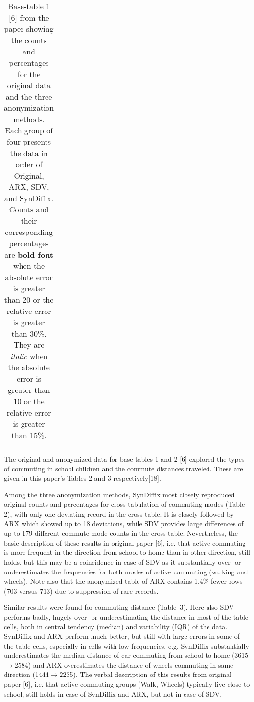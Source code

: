\documentclass[10pt]{article}
\newcommand{\mycite}[1]{[#1]}
\begin{document}
\begin{table}
\begin{center}
\begin{small}
\begin{tabular}{lllllll}
      \bottomrule
      \end{tabular}
      \end{small}
      \caption{Base-table 1 \mycite{6} from the paper showing the counts and percentages for the original data and the three anonymization methods. Each group of four presents the data in order of Original, ARX, SDV, and SynDiffix. Counts and their corresponding percentages are \textbf{bold font} when the absolute error is greater than 20 or the relative error is greater than 30\%. They are \textit{italic} when the absolute error is greater than 10 or the relative error is greater than 15\%.}
      \label{tab:table1}
      \end{center}
      \end{table}
      \setlength{\fboxsep}{3pt}


The original and anonymized data for base-tables 1 and 2 \mycite{6} explored the types of commuting in school children and the commute distances traveled. These are given in this paper's Tables 2 and 3 respectively\mycite{18}. 

Among the three anonymization methods, SynDiffix most closely reproduced original counts and percentages for cross-tabulation of commuting modes (Table 2), with only one deviating record in the cross table. It is closely followed by ARX which showed up to 18 deviations, while SDV provides large differences of up to 179 different commute mode counts in the cross table. Nevertheless, the basic description of these results in original paper \mycite{6}, i.e. that active commuting is more frequent in the direction from school to home than in other direction, still holds, but this may be a coincidence in case of SDV as it substantially over- or underestimates the frequencies for both modes of active commuting (walking and wheels). Note also that the anonymized table of ARX contains 1.4\% fewer rows (703 versus 713) due to suppression of rare records.

Similar results were found for commuting distance (Table~3). Here also SDV performs badly, hugely over- or underestimating the distance in most of the table cells, both in central tendency (median) and variability (IQR) of the data. SynDiffix and ARX perform much better, but still with large errors in some of the table cells, especially in cells with low frequencies, e.g. SynDiffix substantially underestimates the median distance of car commuting from school to home (3615$\rightarrow$2584) and ARX overestimates the distance of wheels commuting in same direction (1444$\rightarrow$2235). The verbal description of this results from original paper \mycite{6}, i.e. that active commuting groups (Walk, Wheels) typically live
close to school, still holds in case of SynDiffix and ARX, but not in case of SDV.
\end{document}
